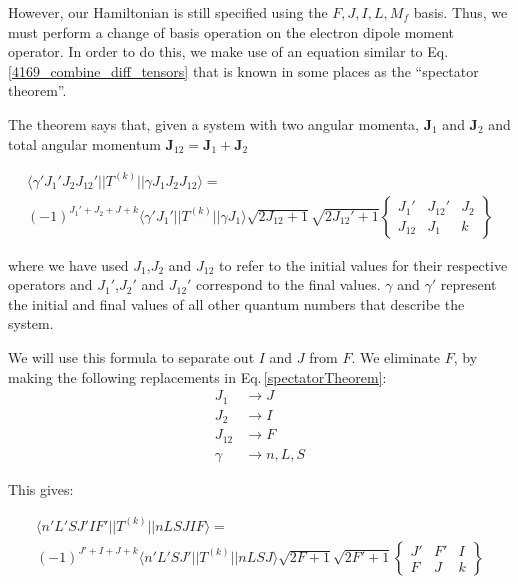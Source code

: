 However, our Hamiltonian is still specified using the $F,J,I,L,M_f$ basis. Thus, we must perform a change of basis operation on the electron dipole moment operator. In order to do this, we make use of an equation similar to Eq.\,\ref{4169_combine_diff_tensors} that is known in some places as the ``spectator theorem''\cite{DeMille_presentation}. %

The theorem says that, given a system with two angular momenta, $\mathbf{J}_1$ and $\mathbf{J}_2$ and total angular momentum $\mathbf{J}_{12}=\mathbf{J}_1+\mathbf{J}_2$ 

\begin{multline}\label{spectatorTheorem}
\langle\gamma' J_1'J_2J_{12}'||T^{(k)}||\gamma J_1 J_2 J_{12}\rangle=
\\(-1)^{J_1'+J_2+J+k}\langle\gamma'J_1'||T^{(k)}||\gamma J_1\rangle
\sqrt{2J_{12}+1}\sqrt{2J_{12}'+1}
\begin{Bmatrix}
J_1' & J_{12}' & J_2 \\
J_{12} & J_1 & k
\end{Bmatrix}
\end{multline}

where we have used $J_{1}$,$J_{2}$ and $J_{12}$ to refer to the initial values for their respective operators and $J_{1}'$,$J_{2}'$ and $J_{12}'$ correspond to the final values. $\gamma$ and $\gamma'$ represent the initial and final values of all other quantum numbers that describe the system.

We will use this formula to separate out $I$ and $J$ from $F$.
We eliminate $F$, by making the following replacements in Eq.\,\ref{spectatorTheorem}:
\begin{align}
J_1&\rightarrow J\\
J_2&\rightarrow I\\
J_{12}&\rightarrow F\\
\gamma &\rightarrow  n,L,S
\end{align}

This gives: 

\begin{multline}\label{spectatorTheorem1}
\langle n' L' S J' I F'||T^{(k)}||n L S J I F\rangle=
\\(-1)^{J'+I+J+k}\langle n'L' S J'||T^{(k)}|| n L S J\rangle
\sqrt{2F+1}\sqrt{2F'+1}
\begin{Bmatrix}
J' & F' & I \\
F & J & k
\end{Bmatrix}
\end{multline}

